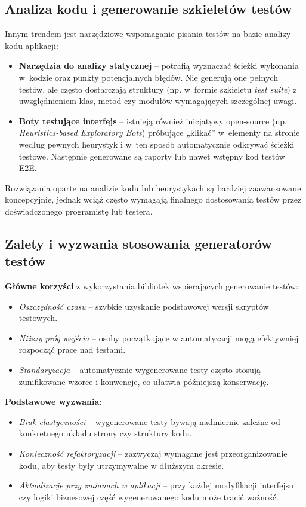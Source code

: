 \documentclass[12pt]{report}
\begin{document}
\subsection*{Analiza kodu i generowanie szkieletów testów}
Innym trendem jest narzędziowe wspomaganie pisania testów na bazie analizy kodu aplikacji:
\begin{itemize}
    \item \textbf{Narzędzia do analizy statycznej} – potrafią wyznaczać ścieżki wykonania w~kodzie oraz punkty potencjalnych błędów. Nie generują one pełnych testów, ale często dostarczają struktury (np. w~formie szkieletu \emph{test suite}) z uwzględnieniem klas, metod czy modułów wymagających szczególnej uwagi.
    \item \textbf{Boty testujące interfejs} – istnieją również inicjatywy open-source (np. \emph{Heuristics-based Exploratory Bots}) próbujące „klikać” w~elementy na stronie według pewnych heurystyk i w~ten sposób automatycznie odkrywać ścieżki testowe. Następnie generowane są raporty lub nawet wstępny kod testów E2E.
\end{itemize}
Rozwiązania oparte na analizie kodu lub heurystykach są bardziej zaawansowane koncepcyjnie, jednak wciąż często wymagają finalnego dostosowania testów przez doświadczonego programistę lub testera.

\subsection*{Zalety i wyzwania stosowania generatorów testów}
\textbf{Główne korzyści} z wykorzystania bibliotek wspierających generowanie testów:
\begin{itemize}
    \item \emph{Oszczędność czasu} – szybkie uzyskanie podstawowej wersji skryptów testowych.
    \item \emph{Niższy próg wejścia} – osoby początkujące w automatyzacji mogą efektywniej rozpocząć prace nad testami.
    \item \emph{Standaryzacja} – automatycznie wygenerowane testy często stosują zunifikowane wzorce i konwencje, co ułatwia późniejszą konserwację.
\end{itemize}
\textbf{Podstawowe wyzwania}:
\begin{itemize}
    \item \emph{Brak elastyczności} – wygenerowane testy bywają nadmiernie zależne od konkretnego układu strony czy struktury kodu.
    \item \emph{Konieczność refaktoryzacji} – zazwyczaj wymagane jest przeorganizowanie kodu, aby testy były utrzymywalne w dłuższym okresie.
    \item \emph{Aktualizacje przy zmianach w aplikacji} – przy każdej modyfikacji interfejsu czy logiki biznesowej część wygenerowanego kodu może tracić ważność.
\end{itemize}
\end{document}
